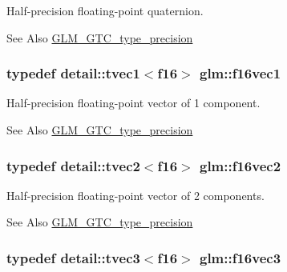 Half-\/precision floating-\/point quaternion. 

\begin{DoxySeeAlso}{See Also}
\hyperlink{group__gtc__type__precision}{G\-L\-M\-\_\-\-G\-T\-C\-\_\-type\-\_\-precision} 
\end{DoxySeeAlso}
\hypertarget{group__gtc__type__precision_ga56f4754172a1f0fb186d95e865106f5a}{
\subsubsection[{f16vec1}]{\setlength{\rightskip}{0pt plus 5cm}typedef detail\-::tvec1$<$f16$>$ {\bf glm\-::f16vec1}}}\label{group__gtc__type__precision_ga56f4754172a1f0fb186d95e865106f5a}


Half-\/precision floating-\/point vector of 1 component. 

\begin{DoxySeeAlso}{See Also}
\hyperlink{group__gtc__type__precision}{G\-L\-M\-\_\-\-G\-T\-C\-\_\-type\-\_\-precision} 
\end{DoxySeeAlso}
\hypertarget{group__gtc__type__precision_gaba661ca6411ee721e3db5b42ff2755a3}{
\subsubsection[{f16vec2}]{\setlength{\rightskip}{0pt plus 5cm}typedef detail\-::tvec2$<$f16$>$ {\bf glm\-::f16vec2}}}\label{group__gtc__type__precision_gaba661ca6411ee721e3db5b42ff2755a3}


Half-\/precision floating-\/point vector of 2 components. 

\begin{DoxySeeAlso}{See Also}
\hyperlink{group__gtc__type__precision}{G\-L\-M\-\_\-\-G\-T\-C\-\_\-type\-\_\-precision} 
\end{DoxySeeAlso}
\hypertarget{group__gtc__type__precision_gaf59829bded825811f821a3e2aaf6db04}{
\subsubsection[{f16vec3}]{\setlength{\rightskip}{0pt plus 5cm}typedef detail\-::tvec3$<$f16$>$ {\bf glm\-::f16vec3}}}\label{group__gtc__type__precision_gaf59829bded825811f821a3e2aaf6db04}


